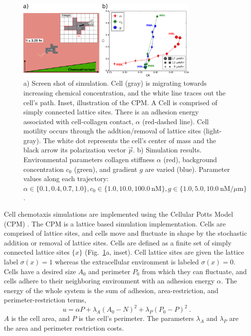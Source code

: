 \begin{figure}
    \centering
    \includegraphics[width=0.80\textwidth]{../fig/ch2_fig3.png}
    \caption{a) Screen shot of simulation. Cell (gray) is migrating towards increasing chemical concentration, and the white line traces out the cell's path. Inset, illustration of the CPM. A Cell is comprised of simply connected lattice sites. There is an adhesion energy associated with cell-collagen contact, $\alpha$ (red-dashed line). Cell motility occurs through the addtion/removal of lattice sites (light-gray). The white dot represents the cell's center of mass and the black arrow its polarization vector $\vec{p}$. b) Simulation results. Environmental parameters collagen stiffness $\alpha$ (red), background concentration $c_0$ (green), and gradient $g$ are varied (blue).
    Parameter values along each trajectory: $\alpha \in \{ 0.1, 0.4, 0.7, 1.0 \}, c_0 \in \{ 1.0, 10.0, 100.0 \ \text{nM} \}, g \in \{ 1.0, 5.0, 10.0 \ \text{nM}/\mu\text{m} \}$.}
    \label{fig:ch2_3}
\end{figure}

Cell chemotaxis simulations are implemented using the Cellular Potts Model (CPM) \cite{graner1992simulation,swat2012multi}. The CPM is a lattice based simulation implementation. Cells are comprised of lattice sites, and cells move and fluctuate in shape by the stochastic addition or removal of lattice sites.
Cells are defined as a finite set of simply connected lattice sites $\{ x \}$ (Fig.\ \ref{fig:ch2_3}a, inset).
Cell lattice sites are given the lattice label $\sigma(x)=1$ whereas the extracellular environment is labeled $\sigma(x)=0$. Cells have a desired size $A_0$ and perimeter $P_0$ from which they can fluctuate, and cells adhere to their neighboring environment with an adhesion energy $\alpha$. The energy of the whole system is the sum of adhesion, area-restriction, and perimeter-restriction terms,
\begin{equation} \label{eq:CPMu1}
    u = \alpha P + \lambda_A(A_0 - N)^2 + \lambda_P(P_0 - P)^2 \ .
\end{equation}
$A$ is the cell area, and $P$ is the cell's perimeter. The parameters $\lambda_{A}$ and $\lambda_{P}$ are the area and perimeter restriction costs.

